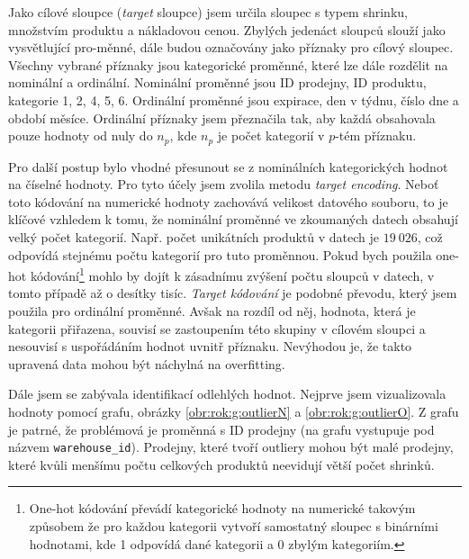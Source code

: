 Jako cílové sloupce (\emph{target} sloupce) jsem určila sloupec s typem shrinku, množstvím produktu a nákladovou cenou. Zbylých jedenáct sloupců slouží jako vysvětlující pro-\linebreak měnné, dále budou označovány jako příznaky pro cílový sloupec. Všechny vybrané příznaky jsou kategorické proměnné, které lze dále rozdělit na nominální a ordinální. Nominální proměnné jsou ID prodejny, ID produktu, kategorie 1, 2, 4, 5, 6. Ordinální proměnné jsou expirace, den v týdnu, číslo dne a období měsíce. Ordinální příznaky jsem přeznačila tak, aby každá obsahovala pouze hodnoty od nuly do $n_p$, kde $n_p$ je počet kategorií v $p$-tém příznaku. 

Pro další postup bylo vhodné přesunout se z nominálních kategorických hodnot na číselné hodnoty. Pro tyto účely jsem zvolila metodu \emph{target encoding}.  %
Neboť toto kódování na numerické hodnoty zachovává velikost datového souboru, to je klíčové vzhledem k tomu, že nominální proměnné ve zkoumaných datech obsahují velký počet kategorií. Např. počet unikátních produktů v datech je $19\ 026$, což odpovídá stejnému počtu kategorií pro tuto proměnnou. Pokud bych použila one-hot kódování\footnote{One-hot kódování převádí kategorické hodnoty na numerické takovým způsobem že pro každou kategorii vytvoří samostatný sloupec s binárními hodnotami, kde 1 odpovídá dané kategorii a 0 zbylým kategoriím.}  mohlo by dojít k zásadnímu zvýšení počtu sloupců v datech, v tomto případě až o desítky tisíc. \emph{Target kódování} je podobné převodu, který jsem použila pro ordinální proměnné. Avšak na rozdíl od něj, hodnota, která je kategorii přiřazena, souvisí se zastoupením této skupiny v cílovém sloupci a nesouvisí s uspořádáním hodnot uvnitř příznaku. Nevýhodou je, že takto upravená data mohou být náchylná na overfitting. 


Dále jsem se zabývala identifikací odlehlých hodnot. Nejprve jsem vizualizovala hodnoty pomocí grafu, obrázky \ref*{obr:rok:g:outlierN} a \ref*{obr:rok:g:outlierO}. Z grafu je patrné, že problémová je proměnná s ID prodejny (na grafu vystupuje pod názvem \texttt{warehouse\_id}). Prodejny, které tvoří outliery mohou být malé prodejny, které kvůli menšímu počtu celkových produktů neevidují větší počet shrinků. %

